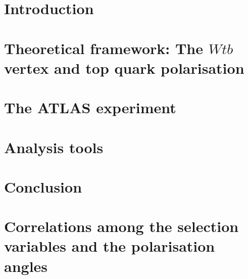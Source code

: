 \documentclass[12pt,a4paper, twoside]{article}
\begin{document}



\newpage
\tableofcontents
\newpage
\section{Introduction}  \label{sec:ch01}

\section{Theoretical framework: The \boldmath$Wtb$ vertex and top quark polarisation} \label{sec:ch02}

\section{The ATLAS experiment} \label{sec:ch03}

\section{Analysis tools} \label{sec:ch04}

\section{Conclusion} \label{sec:conclusions}

\appendix
\section{Correlations among the selection variables and the polarisation angles} \label{sec:AppendixA}

\newpage
 

\end{document}
